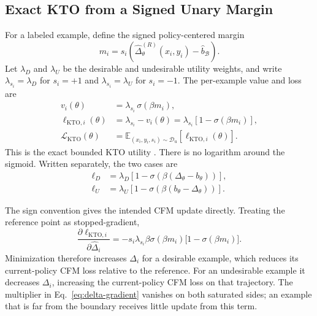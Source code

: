 \documentclass[10pt]{article}
\newcommand{\E}{\mathbb{E}}
\newcommand{\Dunary}{\mathcal{D}_{\mathrm{u}}}
\newcommand{\Lkto}{\mathcal{L}_{\mathrm{KTO}}}
\begin{document}
\subsection{Exact KTO from a Signed Unary Margin}

For a labeled example, define the signed policy-centered margin
\begin{equation}
    m_i=s_i\left(
        \widehat{\Delta}^{(R)}_\theta(x_i,y_i)
        -\widehat{b}_{\mathcal{B}}
        \right).
    \label{eq:margin}
\end{equation}
Let $\lambda_D$ and $\lambda_U$ be the desirable and undesirable utility
weights, and write $\lambda_{s_i}=\lambda_D$ for $s_i=+1$ and
$\lambda_{s_i}=\lambda_U$ for $s_i=-1$. The per-example value and loss are
\begin{align}
    v_i(\theta)
    &=\lambda_{s_i}\,\sigma(\beta m_i), \\
    \ell_{\mathrm{KTO},i}(\theta)
    &=\lambda_{s_i}-v_i(\theta)
      =\lambda_{s_i}\left[1-\sigma(\beta m_i)\right], \\
    \Lkto(\theta)
    &=\E_{(x_i,y_i,s_i)\sim\Dunary}
      \left[\ell_{\mathrm{KTO},i}(\theta)\right].
    \label{eq:kto}
\end{align}
This is the exact bounded KTO utility \cite{ethayarajh2024kto}. There is no
logarithm around the sigmoid. Written separately, the two cases are
\begin{align}
    \ell_D
    &=\lambda_D\left[
      1-\sigma\!\left(\beta(\Delta_\theta-b_\theta)\right)
      \right], \\
    \ell_U
    &=\lambda_U\left[
      1-\sigma\!\left(\beta(b_\theta-\Delta_\theta)\right)
      \right].
    \label{eq:kto-cases}
\end{align}

The sign convention gives the intended CFM update directly. Treating the
reference point as stopped-gradient,
\begin{equation}
    \frac{\partial \ell_{\mathrm{KTO},i}}
         {\partial \widehat{\Delta}_i}
    =-s_i\lambda_{s_i}\beta
      \sigma(\beta m_i)\bigl[1-\sigma(\beta m_i)\bigr].
    \label{eq:delta-gradient}
\end{equation}
Minimization therefore increases $\Delta_i$ for a desirable example, which
reduces its current-policy CFM loss relative to the reference. For an
undesirable example it decreases $\Delta_i$, increasing the current-policy CFM
loss on that trajectory. The multiplier in Eq.~\eqref{eq:delta-gradient}
vanishes on both saturated sides; an example that is far from the boundary
receives little update from this term.
\end{document}

